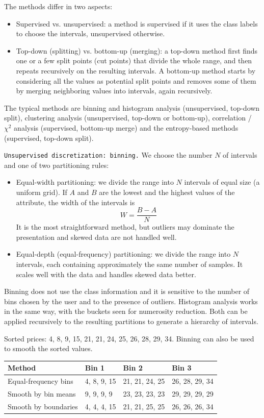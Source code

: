 The methods differ in two aspects:
\begin{itemize}
    \item Supervised vs. unsupervised: a method is supervised if it uses the class labels to choose the intervals, unsupervised otherwise.
    \item Top-down (splitting) vs. bottom-up (merging): a top-down method first finds one or a few split points (cut points) that divide the whole range, and then repeats recursively on the resulting intervals. A bottom-up method starts by considering all the values as potential split points and removes some of them by merging neighboring values into intervals, again recursively.
\end{itemize}
The typical methods are binning and histogram analysis (unsupervised, top-down split), clustering analysis (unsupervised, top-down or bottom-up), correlation / $\chi^2$ analysis (supervised, bottom-up merge) and the entropy-based methods (supervised, top-down split).

\texttt{Unsupervised discretization: binning.} We choose the number $N$ of intervals and one of two partitioning rules:
\begin{itemize}
    \item Equal-width partitioning: we divide the range into $N$ intervals of equal size (a uniform grid). If $A$ and $B$ are the lowest and the highest values of the attribute, the width of the intervals is
    \[
        W = \frac{B-A}{N}
    \]
    It is the most straightforward method, but outliers may dominate the presentation and skewed data are not handled well.
    \item Equal-depth (equal-frequency) partitioning: we divide the range into $N$ intervals, each containing approximately the same number of samples. It scales well with the data and handles skewed data better.
\end{itemize}
Binning does not use the class information and it is sensitive to the number of bins chosen by the user and to the presence of outliers. Histogram analysis works in the same way, with the buckets seen for numerosity reduction. Both can be applied recursively to the resulting partitions to generate a hierarchy of intervals.

\begin{example}[Binning]
Sorted prices: 4, 8, 9, 15, 21, 21, 24, 25, 26, 28, 29, 34. Binning can also be used to smooth the sorted values.
\begin{center}
\begin{tabular}{llll}
\toprule
Method & Bin 1 & Bin 2 & Bin 3 \\
\midrule
Equal-frequency bins & 4, 8, 9, 15 & 21, 21, 24, 25 & 26, 28, 29, 34 \\
Smooth by bin means & 9, 9, 9, 9 & 23, 23, 23, 23 & 29, 29, 29, 29 \\
Smooth by boundaries & 4, 4, 4, 15 & 21, 21, 25, 25 & 26, 26, 26, 34 \\
\bottomrule
\end{tabular}
\end{center}
\end{example}

